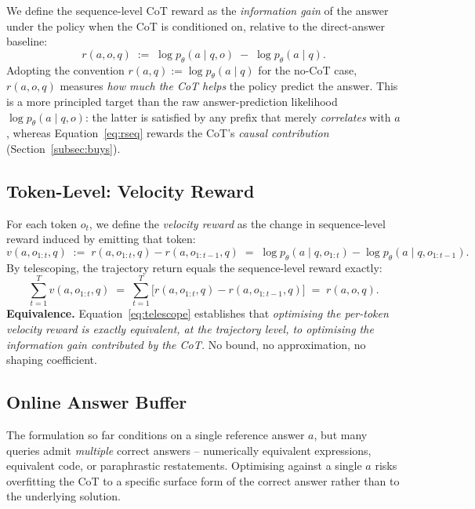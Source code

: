\documentclass{article}
\begin{document}
We define the sequence-level CoT reward as the \emph{information gain} of the
answer under the policy when the CoT is conditioned on, relative to the
direct-answer baseline:
\begin{equation}
r(a, o, q)
\;:=\;
\log p_\theta(a \mid q, o) \;-\; \log p_\theta(a \mid q).
\label{eq:rseq}
\end{equation}
Adopting the convention \(r(a, q) := \log p_\theta(a \mid q)\) for the
no-CoT case, \(r(a, o, q)\) measures \emph{how much the CoT helps} the policy
predict the answer. This is a more principled target than the raw answer-prediction
likelihood \(\log p_\theta(a \mid q, o)\): the latter is satisfied by any
prefix that merely \emph{correlates} with \(a\), whereas
Equation~\ref{eq:rseq} rewards the CoT's \emph{causal contribution} (Section~\ref{subsec:buys}).

\subsection{Token-Level: Velocity Reward}

For each token \(o_t\), we define the \emph{velocity reward} as the change in
sequence-level reward induced by emitting that token:
\begin{equation}
v(a, o_{1:t}, q)
\;:=\;
r(a, o_{1:t}, q) - r(a, o_{1:t-1}, q)
\;=\;
\log p_\theta(a \mid q, o_{1:t}) - \log p_\theta(a \mid q, o_{1:t-1}).
\label{eq:rvel}
\end{equation}
By telescoping, the trajectory return equals the sequence-level reward
exactly:
\begin{equation}
\sum_{t=1}^{T} v(a, o_{1:t}, q)
\;=\;
\sum_{t=1}^{T} \bigl[ r(a, o_{1:t}, q) - r(a, o_{1:t-1}, q) \bigr]
\;=\;
r(a, o, q).
\label{eq:telescope}
\end{equation}
\textbf{Equivalence.}  Equation~\ref{eq:telescope} establishes that
\emph{optimising the per-token velocity reward is exactly equivalent, at the
trajectory level, to optimising the information gain contributed by the
CoT.} No bound, no approximation, no shaping coefficient.

\subsection{Online Answer Buffer}
\label{subsec:buffer}

The formulation so far conditions on a single reference answer \(a\), but
many queries admit \emph{multiple} correct answers -- numerically equivalent
expressions, equivalent code, or paraphrastic restatements. Optimising
against a single \(a\) risks overfitting the CoT to a specific surface form
of the correct answer rather than to the underlying solution.
\end{document}
